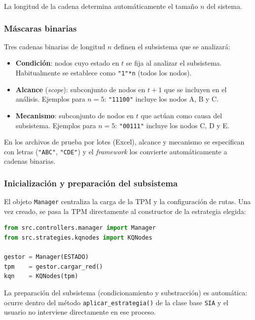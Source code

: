 La longitud de la cadena determina automáticamente el tamaño $n$ del sistema.

\subsubsection{Máscaras binarias}

Tres cadenas binarias de longitud $n$ definen el subsistema que se analizará:

\begin{itemize}
  \item \textbf{Condición}: nodos cuyo estado en $t$ se fija al analizar el subsistema.
        Habitualmente se establece como \texttt{"1"*n} (todos los nodos).
  \item \textbf{Alcance} (\textit{scope}): subconjunto de nodos en $t+1$ que se incluyen
        en el análisis. Ejemplos para $n=5$: \texttt{"11100"} incluye los nodos A, B y C.
  \item \textbf{Mecanismo}: subconjunto de nodos en $t$ que actúan como causa del
        subsistema. Ejemplos para $n=5$: \texttt{"00111"} incluye los nodos C, D y E.
\end{itemize}

En los archivos de prueba por lotes (Excel), alcance y mecanismo se especifican
con letras (\texttt{"ABC"}, \texttt{"CDE"}) y el \textit{framework} los convierte
automáticamente a cadenas binarias.

\subsubsection{Inicialización y preparación del subsistema}

El objeto \texttt{Manager} centraliza la carga de la TPM y la configuración de rutas.
Una vez creado, se pasa la TPM directamente al constructor de la estrategia elegida:

\begin{lstlisting}[language=Python]
from src.controllers.manager import Manager
from src.strategies.kqnodes import KQNodes

gestor = Manager(ESTADO)
tpm    = gestor.cargar_red()
kqn    = KQNodes(tpm)
\end{lstlisting}

La preparación del subsistema (condicionamiento y substracción) es automática:
ocurre dentro del método \texttt{aplicar\_estrategia()} de la clase base \texttt{SIA}
y el usuario no interviene directamente en ese proceso.

